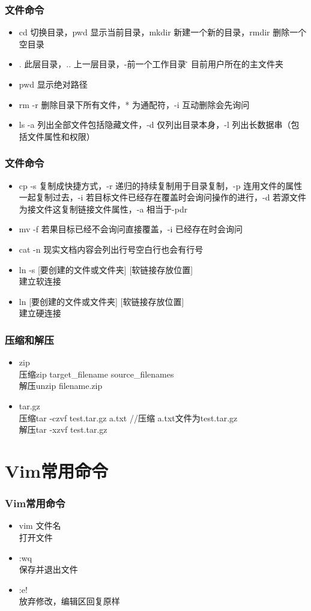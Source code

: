 \documentclass[notheorems,serif]{beamer}
\begin{document}
\begin{frame}
\frametitle{文件命令}
\begin{itemize}
\item cd 切换目录，pwd 显示当前目录，mkdir 新建一个新的目录，rmdir 删除一个空目录
\item . 此层目录，.. 上一层目录，-前一个工作目录，̃ 目前用户所在的主文件夹
\item pwd 显示绝对路径
\item rm -r 删除目录下所有文件，* 为通配符，-i 互动删除会先询问
\item ls -a 列出全部文件包括隐藏文件，-d 仅列出目录本身，-l 列出长数据串（包括文件属性和权限）
\end{itemize}
\end{frame}

\begin{frame}
\frametitle{文件命令}
\begin{itemize}
\item cp -s 复制成快捷方式，-r 递归的持续复制用于目录复制，-p 连用文件的属性一起复制过去，-i 若目标文件已经存在覆盖时会询问操作的进行，-d 若源文件为接文件这复制链接文件属性，-a 相当于-pdr
\item mv -f 若果目标已经不会询问直接覆盖，-i 已经存在时会询问
\item cat -n 现实文档内容会列出行号空白行也会有行号
\item ln -s [要创建的文件或文件夹] [软链接存放位置]\\建立软连接
\item ln [要创建的文件或文件夹] [软链接存放位置]\\建立硬连接
\end{itemize}
\end{frame}


\begin{frame}
\frametitle{压缩和解压}
\begin{itemize}
\item zip\\压缩zip  target\_filename  source\_filenames\\解压unzip filename.zip
\item tar.gz\\压缩tar -czvf test.tar.gz a.txt   //压缩 a.txt文件为test.tar.gz\\解压tar -xzvf test.tar.gz
\end{itemize}
\end{frame}

\section{Vim常用命令}
\begin{frame}
\frametitle{Vim常用命令}
\begin{itemize}
\item vim 文件名
\\打开文件　
\item :wq
\\保存并退出文件
\item :e!
\\放弃修改，编辑区回复原样
\end{itemize}
\end{frame}
\end{document}
